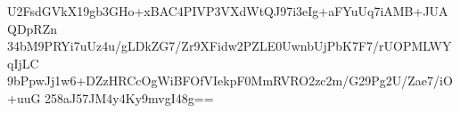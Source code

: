 U2FsdGVkX19gb3GHo+xBAC4PIVP3VXdWtQJ97i3eIg+aFYuUq7iAMB+JUAQDpRZn
34bM9PRYi7uUz4u/gLDkZG7/Zr9XFidw2PZLE0UwnbUjPbK7F7/rUOPMLWYqIjLC
9bPpwJj1w6+DZzHRCcOgWiBFOfVIekpF0MmRVRO2zc2m/G29Pg2U/Zae7/iO+uuG
258aJ57JM4y4Ky9mvgI48g==
